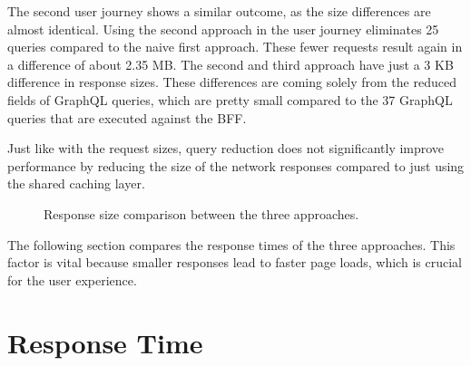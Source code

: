 \bigskip

\noindent The second user journey shows a similar outcome, as the size differences are almost identical. Using the second approach in the user journey eliminates 25 queries compared to the naive first approach. These fewer requests result again in a difference of about 2.35 MB. The second and third approach have just a 3 KB difference in response sizes. These differences are coming solely from the reduced fields of GraphQL queries, which are pretty small compared to the 37 GraphQL queries that are executed against the \ac{BFF}.

\bigskip

\noindent Just like with the request sizes, query reduction does not significantly improve performance by reducing the size of the network responses compared to just using the shared caching layer.

\begin{figure}[H]
  \centering
  \caption{Response size comparison between the three approaches.}\label{fig:discussion:response-size}
\end{figure}

\noindent The following section compares the response times of the three approaches. This factor is vital because smaller responses lead to faster page loads, which is crucial for the user experience.

\section{Response Time}\label{section:discussion:response-times}

